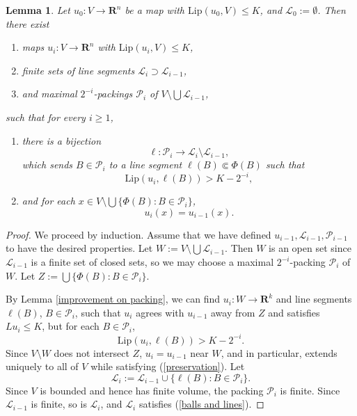 \documentclass[reqno,11pt]{amsart}
\newcommand{\RR}{\mathbf{R}}
\newcommand{\Lip}{\mathrm{Lip}}
\newtheorem{lemma}[theorem]{Lemma}
\theoremstyle{definition}
\numberwithin{equation}{section}
\begin{document}
\begin{lemma}\label{iterating the packing}
Let $u_0: V \to \RR^n$ be a map with $\Lip(u_0, V) \leq K$, and $\mathscr L_0 := \emptyset$.
Then there exist
\begin{enumerate}
\item maps $u_i: V \to \RR^n$ with $\Lip(u_i, V) \leq K$,
\item finite sets of line segments $\mathscr L_i \supset \mathscr L_{i - 1}$,
\item and maximal $2^{-i}$-packings $\mathscr P_i$ of $V \setminus \bigcup \mathscr L_{i - 1}$,
\end{enumerate}
such that for every $i \geq 1$,
\begin{enumerate}
\item \label{balls and lines} there is a bijection
$$\ell: \mathscr P_i \to \mathscr L_i \setminus \mathscr L_{i - 1},$$
which sends $B \in \mathscr P_i$ to a line segment $\ell(B) \Subset \Phi(B)$ such that
$$\Lip(u_i, \ell(B)) > K - 2^{-i},$$
\item \label{preservation} and for each $x \in V \setminus \bigcup \{\Phi(B): B \in \mathscr P_i\}$,
$$u_i(x) = u_{i - 1}(x).$$
\end{enumerate}
\end{lemma}
\begin{proof}
We proceed by induction. Assume that we have defined $u_{i - 1}, \mathscr L_{i - 1}, \mathscr P_{i - 1}$ to have the desired properties.
Let $W := V \setminus \bigcup \mathscr L_{i - 1}$.
Then $W$ is an open set since $\mathscr L_{i - 1}$ is a finite set of closed sets, so we may choose a maximal $2^{-i}$-packing $\mathscr P_i$ of $W$.
Let $Z := \bigcup \{\Phi(B): B \in \mathscr P_i\}$.

By Lemma \ref{improvement on packing}, we can find $u_i: W \to \RR^k$ and line segments $\ell(B)$, $B \in \mathscr P_i$, such that $u_i$ agrees with $u_{i - 1}$ away from $Z$ and satisfies $Lu_i \leq K$, but for each $B \in \mathscr P_i$,
$$\Lip(u_i, \ell(B)) > K - 2^{-i}.$$
Since $V \setminus W$ does not intersect $Z$, $u_i = u_{i - 1}$ near $W$, and in particular, extends uniquely to all of $V$ while satisfying (\ref{preservation}).
Let
$$\mathscr L_i := \mathscr L_{i - 1} \cup \{\ell(B): B \in \mathscr P_i\}.$$
Since $V$ is bounded and hence has finite volume, the packing $\mathscr P_i$ is finite.
Since $\mathscr L_{i - 1}$ is finite, so is $\mathscr L_i$, and $\mathscr L_i$ satisfies (\ref{balls and lines}).
\end{proof}
\end{document}
